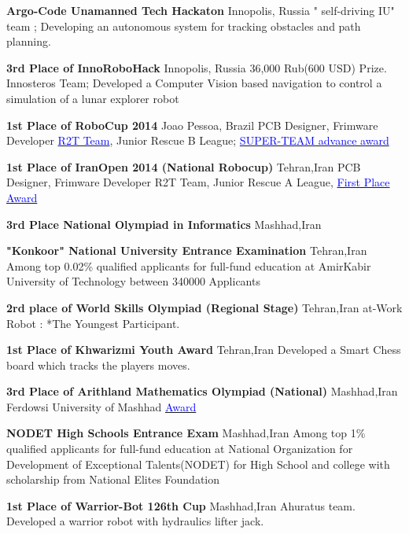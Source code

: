 {\textbf{Argo-Code Unamanned Tech Hackaton }}
{Innopolis, Russia}
{}
{}
{
" self-driving IU" team ; Developing an autonomous system for tracking obstacles and path planning. 
} 
 
{\textbf{3rd Place of InnoRoboHack }}
{Innopolis, Russia}
{}
{}
{
36,000 Rub(600 USD) Prize.
Innosteros Team; Developed a Computer Vision based navigation to control a simulation of a lunar explorer robot 
}
 
{\textbf{1st Place of RoboCup 2014}}
{Joao Pessoa, Brazil}
{\newline PCB Designer, Frimware Developer}
{}
{
\href{http://www.robocup2014.org/?page_id=3318}{\textcolor{blue}{R2T Team}}, Junior Rescue B League; \href{https://drive.google.com/file/d/1r-OCgC7kt6sOVfw2KTvrFq5kaBQ-nFiU/view?usp=sharing}{\textcolor{blue}{SUPER-TEAM advance award}}}


 
{\textbf{1st Place of IranOpen 2014 (National Robocup)}}
{Tehran,Iran}
{\newline PCB Designer, Frimware Developer}
{}
{
	R2T Team, Junior Rescue A League, \href{https://drive.google.com/file/d/1SVeY8KieeonJo1rX8eTNVhbd5ya61Gct/view?usp=sharing}{\textcolor{blue}{First Place Award}}
}

{\textbf{3rd Place National Olympiad in Informatics }}
{Mashhad,Iran}
{}
{}
{	
}


{\textbf{"Konkoor" National University Entrance Examination}}
{Tehran,Iran}
{}
{}
{
Among top 0.02\% qualified applicants for full-fund education at AmirKabir University of Technology between 340000 Applicants
}


{\textbf{2rd place of World Skills Olympiad (Regional Stage)}}
{Tehran,Iran}
{}
{}
{
  at-Work Robot : *The Youngest Participant.
}

{\textbf{1st Place of Khwarizmi Youth Award }}
{Tehran,Iran}
{}
{}
{
    Developed a Smart Chess board which tracks the players moves.
}



{\textbf{3rd Place of Arithland Mathematics Olympiad (National) }}
{Mashhad,Iran}
{Ferdowsi University of Mashhad}
{\href{https://drive.google.com/file/d/1m13vduTQe1rsCELSdiigq0-Qgep3Pecu/view?usp=sharing}{\textcolor{blue}{Award}}}
{}

{\textbf{NODET High Schools Entrance Exam}}
{Mashhad,Iran}
{}
{}
{
Among top 1\% qualified applicants for full-fund education at National Organization for Development of Exceptional Talents(NODET) for High School and college with scholarship from National Elites Foundation
}

{\textbf{1st Place of Warrior-Bot 126th Cup }}
{Mashhad,Iran}
{}
{}
{
   Ahuratus team. Developed a warrior robot with hydraulics lifter jack.
}

